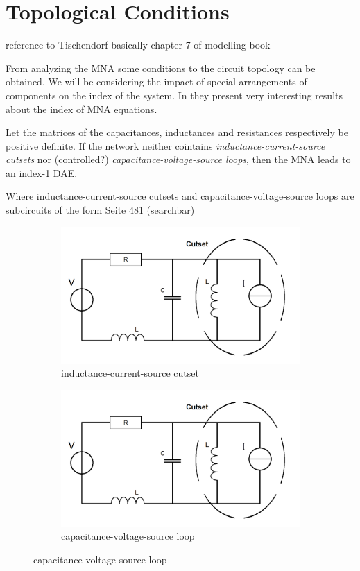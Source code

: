 \section{Topological Conditions} 
reference to Tischendorf
basically chapter 7 of modelling book

From analyzing the MNA some conditions to the circuit topology can be obtained. We will be considering the impact of special arrangements of components on the index of the system. In \cite{Tischendorf2005Topological} they present very interesting results about the index of MNA equations.


\begin{theorem} \cite{Tischendorf2004Topological}
	Let the matrices of the capacitances, inductances and resistances respectively be positive definite. If the network neither cointains \emph{inductance-current-source cutsets} nor (controlled?) \emph{capacitance-voltage-source loops}, then the MNA leads to an index-1 DAE.
\end{theorem}

Where inductance-current-source cutsets and capacitance-voltage-source loops are subcircuits of the form Seite 481 (searchbar)

\begin{figure}[H]
	\begin{subfigure}{0.5\textwidth}
		\includegraphics[width=0.9\linewidth]{pictures/inductance-current-source_cutset.png}
		\caption{inductance-current-source cutset}
	\end{subfigure}
	\begin{subfigure}{0.5\textwidth}
		\includegraphics[width=0.9\linewidth]{pictures/inductance-current-source_cutset.png}
		\caption{capacitance-voltage-source loop}
	\end{subfigure}
\end{figure}

